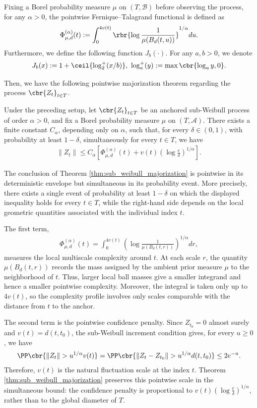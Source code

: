 \documentclass[11pt]{article}
\begin{document}
Fixing a Borel probability measure $\mu$ on $(T,\mathcal B)$ before
observing the process, for any $\alpha>0$, the pointwise Fernique–Talagrand functional \citep{xu2026} is defined as
\[
\Phi_{\mu,d}^{(\alpha)}(t):=\int_{0}^{4v(t)}\rbr{\log\frac{1}{\mu(B_d(t,u))}}^{1/\alpha}du.
\]
Furthermore, we define the following function $J_b(\cdot)$. For any $a,b>0$, we denote
\[
J_b(x):=1+\ceil{\log_2^+(x/b)},\ \log_a^+(y):=\max\cbr{\log_a y,0}.
\]






Then, we have the following pointwise majorization theorem regarding the process $\cbr{Z_t}_{t\in T}$.
\begin{theorem}\label{thm:sub_weibull_majorization}
Under the preceding setup, let $\cbr{Z_t}_{t\in T}$ be an anchored
sub-Weibull process of order $\alpha>0$, and fix a Borel probability
measure $\mu$ on $(T,\mathcal A)$. There exists a finite constant $C_\alpha$,
depending only on $\alpha$, such that, for every $\delta\in(0,1)$, with
probability at least $1-\delta$, simultaneously for every $t\in T$, we
have
\begin{align*}
\|Z_t\|
\le
C_\alpha
\left[
\Phi_{\mu,d}^{(\alpha)}(t)
+
v(t)
\left(
\log\frac{e}{\delta}
\right)^{1/\alpha}
\right].
\end{align*}
\end{theorem}
The conclusion of Theorem \ref{thm:sub_weibull_majorization} is
pointwise in its deterministic envelope but simultaneous in its
probability event. More precisely, there exists a single event of
probability at least $1-\delta$ on which the displayed inequality holds
for every $t\in T$, while the right-hand side depends on the local
geometric quantities associated with the individual index $t$.

The first term,
\begin{align*}
\Phi_{\mu,d}^{(\alpha)}(t)
=
\int_0^{4v(t)}
\left(
\log\frac{1}{\mu(B_d(t,r))}
\right)^{1/\alpha}dr,
\end{align*}
measures the local multiscale complexity around $t$. At each scale $r$,
the quantity $\mu(B_d(t,r))$ records the mass assigned by the ambient prior measure $\mu$ to the neighborhood of $t$. Thus, larger local
ball masses give a smaller integrand and hence a smaller pointwise
complexity. Moreover, the integral is taken only up to $4v(t)$, so the
complexity profile involves only scales comparable with the distance
from $t$ to the anchor.

The second term is the pointwise confidence penalty. Since
$Z_{t_0}=0$ almost surely and $v(t)=d(t,t_0)$, the sub-Weibull increment
condition gives, for every $u\ge0$, we have
\begin{align*}
\PP\cbr{
\|Z_t\|>u^{1/\alpha}v(t)
}=
\PP\cbr{
\|Z_t-Z_{t_0}\|>u^{1/\alpha}d(t,t_0)
}\le2e^{-u}.
\end{align*}
Therefore, $v(t)$ is the natural fluctuation scale at the index $t$.
Theorem \ref{thm:sub_weibull_majorization} preserves this pointwise
scale in the simultaneous bound: the confidence penalty is proportional
to $v(t)
\left(
\log\frac{e}{\delta}
\right)^{1/\alpha}$, rather than to the global diameter of $T$.
\end{document}
